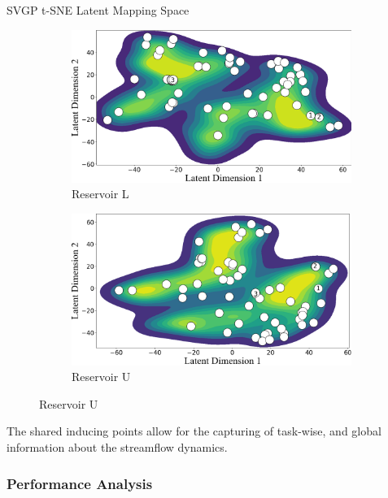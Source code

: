 \begin{frame}{SVGP t-SNE Latent Mapping Space}
\begin{figure}[htbp]
		\begin{subfigure}[t]{0.4\columnwidth}
			\centering
			\includegraphics[width=\columnwidth]{chp_sogp/figures/TSNE_task11_kde_p30.png}
			\caption{Reservoir L}
		\end{subfigure}
		\hspace{0.05\columnwidth} %
		\begin{subfigure}[t]{0.4\columnwidth}
			\centering
			\includegraphics[width=\columnwidth]{chp_sogp/figures/TSNE_task20_kde_p30.png}
			\caption{Reservoir U}
		\end{subfigure}
		
		\vspace{-1.5em} %
	\end{figure}
	\begin{block}{}
	 The shared inducing points allow for the capturing of task-wise, and global information about the streamflow dynamics.
	\end{block}
\end{frame}


\subsubsection{Performance Analysis}


